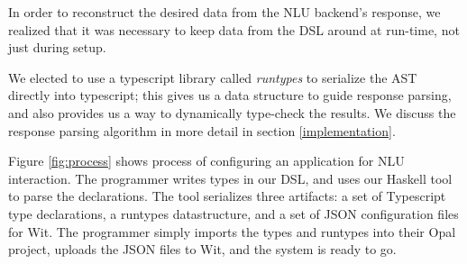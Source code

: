 \documentclass[twocolumn]{article}
\begin{document}
In order to reconstruct the desired data from the NLU backend's response, we
realized that it was necessary to keep data from the DSL around at run-time, not
just during setup.

\begin{figure*}
  \centering
  \caption{The configuration process.}
  \label{fig:process}
\end{figure*}

We elected to use a typescript library called \emph{runtypes} to serialize the
AST directly into typescript; this gives us a data structure to guide response
parsing, and also provides us a way to dynamically type-check the results. We
discuss the response parsing algorithm in more detail in section
\ref{implementation}.

Figure \ref{fig:process} shows process of configuring an application for NLU
interaction. The programmer writes types in our DSL, and uses our Haskell tool
to parse the declarations. The tool serializes three artifacts: a set of
Typescript type declarations, a runtypes datastructure, and a set of JSON
configuration files for Wit. The programmer simply imports the types and
runtypes into their Opal project, uploads the JSON files to Wit, and the system
is ready to go.
\end{document}
